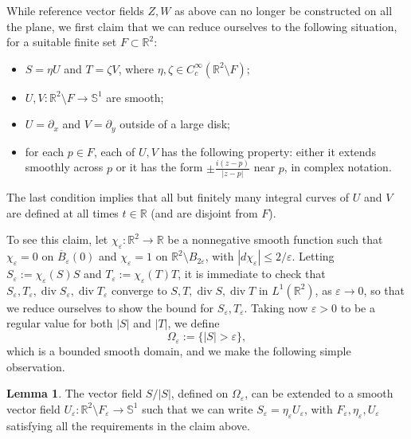 \documentclass[11pt,a4paper]{amsart}
\newcommand{\R}{\mathbb{R}}
\newcommand{\de}{\partial}
\renewcommand{\bar}{\overline}
\theoremstyle{definition}
\newtheorem{lemmaen}[definition]{Lemma}
\renewcommand{\epsilon}{\varepsilon}
\begin{document}
While reference vector fields $Z,W$ as above can no longer be constructed on all the plane,
we first claim that we can reduce ourselves to the following situation, for a suitable finite set $F\subset\R^2$:
\begin{itemize}
\item[(i)] $S=\eta U$ and $T=\zeta V$,
where $\eta,\zeta\in C^\infty_c(\R^2\setminus F)$;
\item[(ii)] $U,V:\R^2\setminus F\to \mathbb{S}^1$ are smooth;
\item[(iii)] $U=\de_x$ and $V=\de_y$ outside of a large disk;
\item[(iv)] for each $p\in F$, each of $U,V$ has the following property: either it extends smoothly across $p$ or it has the form
$\pm\frac{i(z-p)}{|z-p|}$ near $p$, in complex notation.
\end{itemize}
The last condition implies that all but finitely many integral curves of $U$ and $V$
are defined at all times $t\in\R$ (and are disjoint from $F$).

To see this claim, let $\chi_\epsilon:\R^2\to\R$ be a nonnegative smooth function such that
$\chi_\epsilon=0$ on $\bar B_\epsilon(0)$ and $\chi_\epsilon=1$ on $\R^2\setminus B_{2\epsilon}$,
with $|d\chi_\epsilon|\le 2/\epsilon$. Letting $S_\epsilon:=\chi_\epsilon(S) S$ and $T_\epsilon:=\chi_\epsilon(T) T$,
it is immediate to check that $S_\epsilon,T_\epsilon,\operatorname{div}S_\epsilon,\operatorname{div}T_\epsilon$ converge to $S,T,\operatorname{div}S,\operatorname{div}T$ in $L^1(\R^2)$, as $\epsilon\to0$, so that
we reduce ourselves to show the bound for $S_\epsilon,T_\epsilon$. Taking now $\epsilon>0$ to be a regular value for both $|S|$ and $|T|$, we define
$$\Omega_\epsilon:=\{|S|>\epsilon\},$$
which is a bounded smooth domain, and we make the following simple observation.

\begin{lemmaen}
The vector field $S/|S|$, defined on $\Omega_\epsilon$, can be extended to a smooth vector field $U_\epsilon:\R^2\setminus F_\epsilon\to\mathbb{S}^1$ such that we can write
$S_\epsilon=\eta_\epsilon U_\epsilon$, with $F_\epsilon,\eta_\epsilon,U_\epsilon$ satisfying all the requirements in the claim above.
\end{lemmaen}
\end{document}
